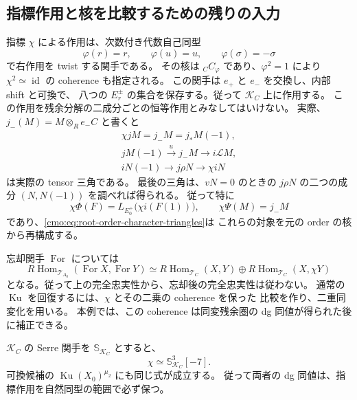 \subsection{指標作用と核を比較するための残りの入力}

指標 $\chi$ による作用は、次数付き代数自己同型
\[
 \varphi(r)=r,\qquad\varphi(u)=u,\qquad
 \varphi(\sigma)=-\sigma
\]
で右作用を twist する関手である。
その核は ${}_CC_\varphi$ であり、$\varphi^2=1$ により
$\chi^2\simeq\operatorname{id}$ の coherence も指定される。
この関手は $e_+$ と $e_-$ を交換し、内部 shift と可換で、
八つの $E_r^\pm$ の集合を保存する。従って $\mathcal K_C$ 上に作用する。
この作用を残余分解の二成分ごとの恒等作用とみなしてはいけない。
実際、$j_-(M)=M\otimes_R e_-C$ と書くと
\begin{equation}
\label{cmo:eq:root-order-character-triangles}
 \begin{gathered}
 \chi jM=j_-M=j_*M(-1),\\
 jM(-1)\xrightarrow{u}j_-M\longrightarrow i\mathcal L M,\\
 iN(-1)\longrightarrow j\rho N\longrightarrow\chi iN
 \end{gathered}
\end{equation}
は実際の tensor 三角である。
最後の三角は、$vN=0$ のときの $j\rho N$ の二つの成分
$(N,N(-1))$ を調べれば得られる。
従って特に
\[
 \chi\Phi(F)=L_{E_0^+}\bigl(\chi i(F(1))\bigr),\qquad
 \chi\Psi(M)=j_-M
\]
であり、\eqref{cmo:eq:root-order-character-triangles}は
これらの対象を元の order の核から再構成する。

忘却関手 $\operatorname{For}$ については
\[
 R\operatorname{Hom}_{\mathcal T_{A_0}}
    (\operatorname{For}X,\operatorname{For}Y)
 \simeq R\operatorname{Hom}_{\mathcal T_C}(X,Y)
       \oplus R\operatorname{Hom}_{\mathcal T_C}(X,\chi Y)
\]
となる。従って上の完全忠実性から、忘却後の完全忠実性は従わない。
通常の $\operatorname{Ku}$ を回復するには、$\chi$ とその二乗の coherence を保った
比較を作り、二重同変化\cite[Theorem~4.2 and Section~8]{MEDElagin}を用いる。
本例では、この coherence は同変残余圏の dg 同値が得られた後に補正できる。

\begin{proposition}
\label{cmo:prop:root-order-intrinsic-character}
$\mathcal K_C$ の Serre 関手を $\mathbb S_{\mathcal K_C}$ とすると、
\begin{equation}
\label{cmo:eq:root-order-intrinsic-character}
 \chi\simeq\mathbb S_{\mathcal K_C}^{3}[-7].
\end{equation}
可換候補の $\operatorname{Ku}(X_0)^{\mu_2}$ にも同じ式が成立する。
従って両者の dg 同値は、指標作用を自然同型の範囲で必ず保つ。
\end{proposition}

